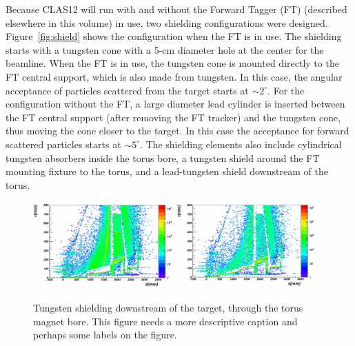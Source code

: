 Because CLAS12 will run with and without the Forward Tagger (FT) (described elsewhere in this volume) in use, two shielding 
configurations were designed. Figure~\ref{fig:shield} shows the configuration when the FT is in use. The shielding starts with a 
tungsten cone with a 5-cm diameter hole at the center for the beamline. When the FT is in use, the tungsten cone is mounted directly 
to the FT central support, which is also made from tungsten. In this case, the angular acceptance of particles scattered from the target 
starts at $\sim 2^\circ$. For the configuration without the FT, a large diameter lead cylinder is inserted between the FT central support 
(after removing the FT tracker) and the tungsten cone, thus moving the cone closer to the target. In this case the acceptance for forward 
scattered particles starts at $\sim 5^\circ$. The shielding elements also include cylindrical tungsten absorbers inside the torus bore, a 
tungsten shield around the FT mounting fixture to the torus, and a lead-tungsten shield downstream of the torus.  

\begin{figure}[t]
\begin{center}
\includegraphics[width=0.48\textwidth]{fton_final_origin.pdf}
\includegraphics[width=0.48\textwidth]{ftoff_final_origin.pdf}
\caption{Tungsten shielding downstream of the target, through the torus magnet bore. {\color{red} This figure needs a more descriptive 
caption and perhaps some labels on the figure.}}
\label{fig:origin}
\end{center}
\end{figure}

